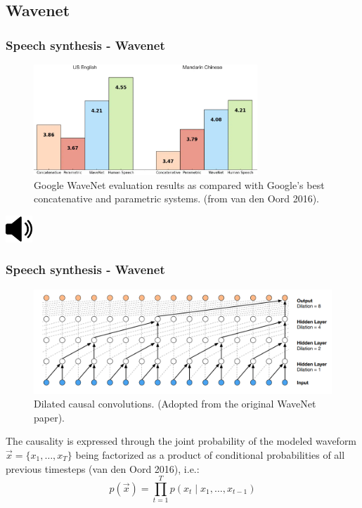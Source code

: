 \documentclass[a4paper,9pt]{beamer}
\theoremstyle{mytheoremstyle}
\begin{document}
\subsection{Wavenet}
\begin{frame}
\frametitle{Speech synthesis - Wavenet}
\begin{figure}
\begin{center}
  \includegraphics[width=0.75\textwidth]{res/wavenet_evaluation.png}
\end{center}
	\caption{Google WaveNet evaluation results as compared with Google's best concatenative and parametric systems. (from van den Oord 2016).}
\end{figure}
\begin{center}
  \includegraphics[width=1cm]{res/speaker_icon.png}
\end{center}
\end{frame}



\begin{frame}
\frametitle{Speech synthesis - Wavenet}
\begin{figure}
\begin{center}
  \includegraphics[width=\textwidth]{res/dilated_convolutions.png}
\end{center}
	\caption{Dilated causal convolutions. (Adopted from the original WaveNet paper).}
\end{figure}
The causality is expressed through the joint probability of the modeled waveform 
$\vec{x} = \{ x_1, \dots, x_T \}$
being factorized as a product of conditional probabilities of all previous timesteps (van den Oord 2016), i.e.:
\begin{equation}
p\left(\vec{x}\right) = \prod_{t=1}^{T} p\left(x_t \mid x_1, \dots ,x_{t-1}\right)
\end{equation}
\end{frame}
\end{document}
